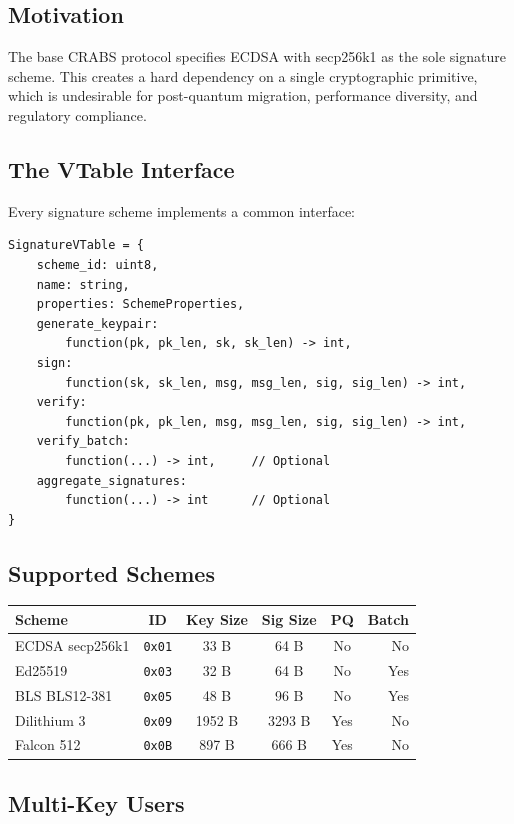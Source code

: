 \documentclass[11pt,a4paper]{article}
\begin{document}
\subsection{Motivation}

The base CRABS protocol specifies ECDSA with secp256k1 as the sole signature scheme. This creates a hard dependency on a single cryptographic primitive, which is undesirable for post-quantum migration, performance diversity, and regulatory compliance.

\subsection{The VTable Interface}

Every signature scheme implements a common interface:

\begin{lstlisting}
SignatureVTable = {
    scheme_id: uint8,
    name: string,
    properties: SchemeProperties,
    generate_keypair:
        function(pk, pk_len, sk, sk_len) -> int,
    sign:
        function(sk, sk_len, msg, msg_len, sig, sig_len) -> int,
    verify:
        function(pk, pk_len, msg, msg_len, sig, sig_len) -> int,
    verify_batch:
        function(...) -> int,     // Optional
    aggregate_signatures:
        function(...) -> int      // Optional
}
\end{lstlisting}

\subsection{Supported Schemes}

\vspace{4pt}
\begin{tabularx}{\textwidth}{lccccr}
\toprule
\textbf{Scheme} & \textbf{ID} & \textbf{Key Size} & \textbf{Sig Size} & \textbf{PQ} & \textbf{Batch} \\
\midrule
ECDSA secp256k1 & \texttt{0x01} & 33 B & 64 B & No & No \\
Ed25519 & \texttt{0x03} & 32 B & 64 B & No & Yes \\
BLS BLS12-381 & \texttt{0x05} & 48 B & 96 B & No & Yes \\
Dilithium 3 & \texttt{0x09} & 1952 B & 3293 B & Yes & No \\
Falcon 512 & \texttt{0x0B} & 897 B & 666 B & Yes & No \\
\bottomrule
\end{tabularx}

\subsection{Multi-Key Users}
\end{document}
